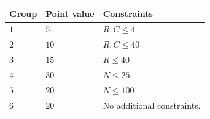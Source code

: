 \noindent
\begin{tabular}{| l | l | p{12cm} |}
  \hline
  \textbf{Group} & \textbf{Point value} & \textbf{Constraints} \\ \hline
  $1$    & $5$          & $R,C \leq 4$  \\ \hline
  $2$    & $10$         & $R,C \leq 40$ \\ \hline
  $3$    & $15$         & $R \leq 40$ \\ \hline
  $4$    & $30$         & $N \leq 25$ \\ \hline
  $5$    & $20$         & $N \leq 100$ \\ \hline
  $6$    & $20$         & No additional constraints. \\ \hline
\end{tabular}



